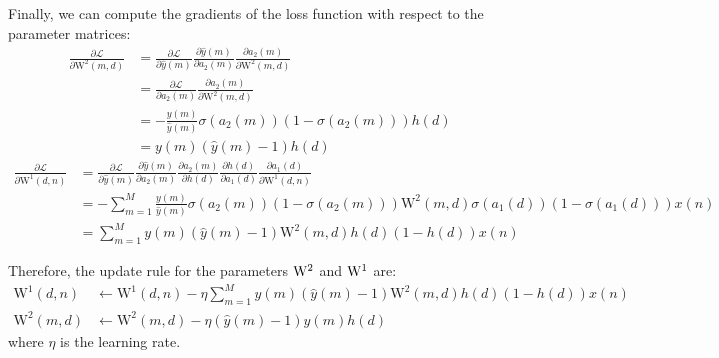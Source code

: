 \documentclass{homework}
\begin{document}
Finally, we can compute the gradients of the loss function with respect to the parameter matrices:
\begin{align*}
    \frac{\partial \mathcal{L}}{\partial \mathrm{W^{2}}(m,d)}
    &=\frac{\partial \mathcal{L}}{\partial \hat{y}(m)} \frac{\partial \hat{y}(m)}{\partial a_{2}(m)}\frac{\partial a_{2}(m)}{\partial \mathrm{W^{2}}(m,d)}\\
    &=\frac{\partial \mathcal{L}}{\partial a_{2}(m)}\frac{\partial a_{2}(m)}{\partial \mathrm{W^{2}}(m,d)}\\
    &=-\frac{y(m)}{\hat{y}(m)}\sigma(a_2(m))(1-\sigma(a_2(m)))h(d)\\
    &=y(m)(\hat{y}(m)-1)h(d)
\end{align*}
\begin{align*}
    \frac{\partial \mathcal{L}}{\partial \mathrm{W^{1}}(d, n)} 
    &= \frac{\partial \mathcal{L}}{\partial \hat{y}(m)} \frac{\partial \hat{y}(m)}{\partial a_{2}(m)} \frac{\partial a_{2}(m)}{\partial h(d)} \frac{\partial h(d)}{\partial a_{1}(d)} \frac{\partial a_{1}(d)}{\partial \mathrm{W^{1}}(d, n)} \\
    &= -\sum_{m=1}^{M}\frac{y(m)}{\hat{y}(m)}\sigma(a_2(m))(1-\sigma(a_2(m))) \mathrm{W^2}(m,d)\sigma(a_1(d))(1-\sigma(a_1(d)))x(n)\\
    &= \sum_{m=1}^{M} y(m)\left(\hat{y}(m)-1\right)\mathrm{W^2}(m,d)h(d)(1-h(d))x(n)
\end{align*}

Therefore, the update rule for the parameters $\rm W^2$ and $\rm W^1$ are:
\begin{align*}
\mathrm{W^1}(d, n) &\leftarrow \mathrm{W^1}(d, n) - \eta \sum_{m=1}^{M} y(m)\left(\hat{y}(m)-1\right)\mathrm{W^2}(m,d)h(d)(1-h(d))x(n)\\
\mathrm{W^2}(m, d) &\leftarrow \mathrm{W^2}(m, d) - \eta (\hat{y}(m)-1)y(m)h(d)
\end{align*}
where $\eta$ is the learning rate.
\end{document}
